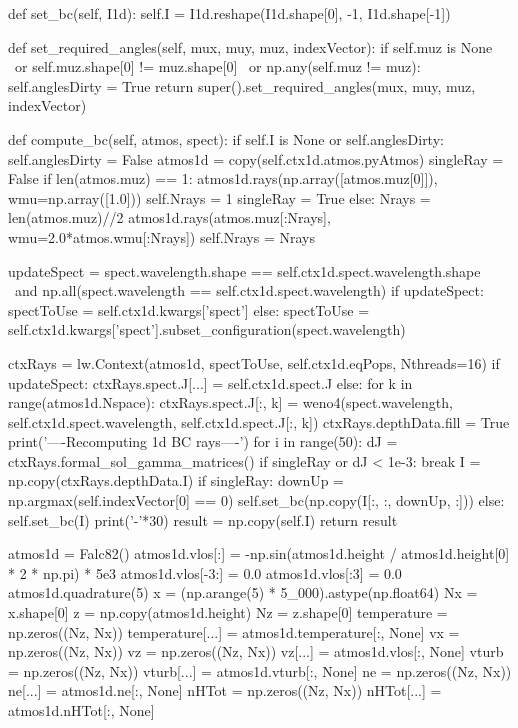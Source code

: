 \begin{pycode}[2DValidation]
    def set_bc(self, I1d):
        self.I = I1d.reshape(I1d.shape[0], -1, I1d.shape[-1])

    def set_required_angles(self, mux, muy, muz, indexVector):
        if self.muz is None \
           or self.muz.shape[0] != muz.shape[0] \
           or np.any(self.muz != muz):
            self.anglesDirty = True
        return super().set_required_angles(mux, muy, muz, indexVector)

    def compute_bc(self, atmos, spect):
        if self.I is None or self.anglesDirty:
            self.anglesDirty = False
            atmos1d = copy(self.ctx1d.atmos.pyAtmos)
            singleRay = False
            if len(atmos.muz) == 1:
                atmos1d.rays(np.array([atmos.muz[0]]), wmu=np.array([1.0]))
                self.Nrays = 1
                singleRay = True
            else:
                Nrays = len(atmos.muz)//2
                atmos1d.rays(atmos.muz[:Nrays], wmu=2.0*atmos.wmu[:Nrays])
                self.Nrays = Nrays

            updateSpect = spect.wavelength.shape == self.ctx1d.spect.wavelength.shape \
                          and np.all(spect.wavelength == self.ctx1d.spect.wavelength)
            if updateSpect:
                spectToUse = self.ctx1d.kwargs['spect']
            else:
                spectToUse = self.ctx1d.kwargs['spect'].subset_configuration(spect.wavelength)

            ctxRays = lw.Context(atmos1d, spectToUse, self.ctx1d.eqPops, Nthreads=16)
            if updateSpect:
                ctxRays.spect.J[...] = self.ctx1d.spect.J
            else:
                for k in range(atmos1d.Nspace):
                    ctxRays.spect.J[:, k] = weno4(spect.wavelength, self.ctx1d.spect.wavelength,
                                                                    self.ctx1d.spect.J[:, k])
            ctxRays.depthData.fill = True
            print('----Recomputing 1d BC rays----')
            for i in range(50):
                dJ = ctxRays.formal_sol_gamma_matrices()
                if singleRay or dJ < 1e-3:
                    break
            I = np.copy(ctxRays.depthData.I)
            if singleRay:
                downUp = np.argmax(self.indexVector[0] == 0)
                self.set_bc(np.copy(I[:, :, downUp, :]))
            else:
                self.set_bc(I)
            print('-'*30)
        result = np.copy(self.I)
        return result

atmos1d = Falc82()
atmos1d.vlos[:] = -np.sin(atmos1d.height / atmos1d.height[0] * 2 * np.pi) * 5e3
atmos1d.vlos[-3:] = 0.0
atmos1d.vlos[:3] = 0.0
atmos1d.quadrature(5)
x = (np.arange(5) * 5_000).astype(np.float64)
Nx = x.shape[0]
z = np.copy(atmos1d.height)
Nz = z.shape[0]
temperature = np.zeros((Nz, Nx))
temperature[...] = atmos1d.temperature[:, None]
vx = np.zeros((Nz, Nx))
vz = np.zeros((Nz, Nx))
vz[...] = atmos1d.vlos[:, None]
vturb = np.zeros((Nz, Nx))
vturb[...] = atmos1d.vturb[:, None]
ne = np.zeros((Nz, Nx))
ne[...] = atmos1d.ne[:, None]
nHTot = np.zeros((Nz, Nx))
nHTot[...] = atmos1d.nHTot[:, None]


\end{pycode}
